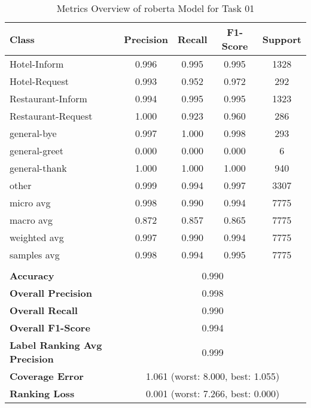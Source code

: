 
\begin{table}[h]
\centering

\begin{tabular}{|l|c|c|c|c|}
\hline
\textbf{Class}& \textbf{Precision} & \textbf{Recall} & \textbf{F1-Score} & \textbf{Support} \\ \hline
Hotel-Inform & 0.996 & 0.995 & 0.995 & 1328 \\ \hline
Hotel-Request & 0.993 & 0.952 & 0.972 & 292 \\ \hline
Restaurant-Inform & 0.994 & 0.995 & 0.995 & 1323 \\ \hline
Restaurant-Request & 1.000 & 0.923 & 0.960 & 286 \\ \hline
general-bye & 0.997 & 1.000 & 0.998 & 293 \\ \hline
general-greet & 0.000 & 0.000 & 0.000 & 6 \\ \hline
general-thank & 1.000 & 1.000 & 1.000 & 940 \\ \hline
other & 0.999 & 0.994 & 0.997 & 3307 \\ \hline\hline
micro avg & 0.998 & 0.990 & 0.994 & 7775 \\ \hline
macro avg & 0.872 & 0.857 & 0.865 & 7775 \\ \hline
weighted avg & 0.997 & 0.990 & 0.994 & 7775 \\ \hline
samples avg & 0.998 & 0.994 & 0.995 & 7775 \\ \hline
\multicolumn{5}{c}{}\\ \hline

\textbf{Accuracy}                    & \multicolumn{4}{c|}{0.990}                                 \\ \hline
\textbf{Overall Precision}           & \multicolumn{4}{c|}{0.998}                                \\ \hline
\textbf{Overall Recall}              & \multicolumn{4}{c|}{0.990}                                   \\ \hline
\textbf{Overall F1-Score}            & \multicolumn{4}{c|}{0.994}                                  \\ \hline
\textbf{Label Ranking Avg Precision} & \multicolumn{4}{c|}{0.999}                                    \\ \hline
\textbf{Coverage Error}              & \multicolumn{4}{c|}{1.061 (worst: 8.000, best: 1.055)}                             \\ \hline
\textbf{Ranking Loss}                & \multicolumn{4}{c|}{0.001 (worst: 7.266, best: 0.000)}                             \\ \hline
\end{tabular}

\caption{Metrics Overview of roberta Model for Task 01}
\label{table:roberta_metrics_task_01}
\end{table}
    